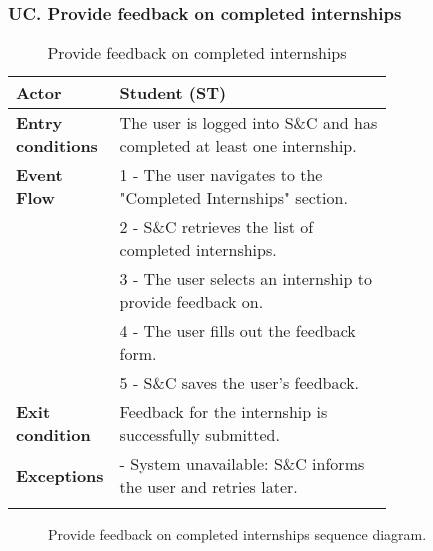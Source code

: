 \subsubsection*{UC\cuc . Provide feedback on completed internships}
\begin{center}
    \begin{longtable}{|l|p{0.75\linewidth}|}
        \hline
        \textbf{Actor}            & Student (ST) \\
        \hline
        \textbf{Entry conditions} & The user is logged into S\&C and has completed at least one internship. \\
        \hline
        \textbf{Event Flow}       & 1 - The user navigates to the "Completed Internships" section. \\
        & 2 - S\&C retrieves the list of completed internships. \\
        & 3 - The user selects an internship to provide feedback on. \\
        & 4 - The user fills out the feedback form. \\
        & 5 - S\&C saves the user's feedback. \\
        \hline
        \textbf{Exit condition}   & Feedback for the internship is successfully submitted. \\       
        \hline
        \textbf{Exceptions}       & - System unavailable: S\&C informs the user and retries later. \\
        \hline
        \caption{Provide feedback on completed internships}
        \label{tab:provide_feedback_usecase}
    \end{longtable}
\end{center}

\begin{figure}[H]
    \begin{center}
        
        \caption{Provide feedback on completed internships sequence diagram.}
        \label{fig:provide_feedback_seqd}%
    \end{center}
\end{figure}


